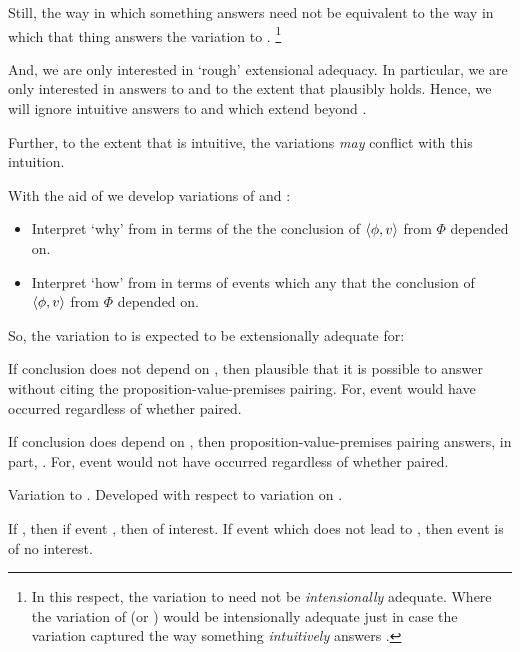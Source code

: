 \begin{note}
  Still, the way in which something answers \qWhy{} need not be equivalent to the way in which that thing answers the variation to \qWhy{}.%
  \footnote{
    In this respect, the variation to \qWhy{} need not be \emph{intensionally} adequate.
    Where the variation of \qWhy{} (or \qHow{}) would be intensionally adequate just in case the variation captured the way something \emph{intuitively} answers \qWhy{}.
  }

  And, we are only interested in `rough' extensional adequacy.
  In particular, we are only interested in answers to \qWhy{} and \qHow{} to the extent that \issueInclusion{} plausibly holds.
  Hence, we will ignore intuitive answers to \qWhy{} and \qHow{} which extend beyond \issueInclusion{}.

  Further, to the extent that \issueInclusion{} is intuitive, the variations \emph{may} conflict with this intuition.
\end{note}

\begin{note}
  With the aid of  we develop variations of \qWhy{} and \qHow{}:

  \begin{itemize}
  \item
    Interpret `why' from \qWhy{} in terms of the  the \agents{} conclusion of \(\langle \phi, v \rangle\) from \(\Phi\) depended on.
  \item
    Interpret `how' from \qHow{} in terms of events which  any \ros{} that the \agents{} conclusion of \(\langle \phi, v \rangle\) from \(\Phi\) depended on.
  \end{itemize}

  So, the variation to \qWhy{} is expected to be extensionally adequate for:

  If conclusion does not depend on \ros{}, then plausible that it is possible to answer \qWhy{} without citing the proposition-value-premises pairing.
  For, event would have occurred regardless of whether paired.

  If conclusion does depend on \ros{}, then proposition-value-premises pairing answers, in part, \qWhy{}.
  For, event would not have occurred regardless of whether paired.

  Variation to \qHow{}.
  Developed with respect to variation on \qWhy{}.

  If \ros{}, then if event \wit{} \ros{}, then of interest.
  If event which does not lead to \ros{}, then event is of no interest.
\end{note}


